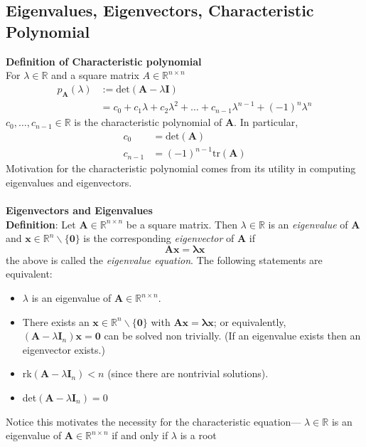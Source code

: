 \documentclass{report}
\begin{document}
\subsection{Eigenvalues, Eigenvectors, Characteristic Polynomial}%
\textbf{Definition of Characteristic polynomial}\\
For $\lambda\in\mathbb{R}$ and a square matrix $A\in\mathbb{R}^{n\times n}$
\begin{align*}
p_{\bm{A}}(\lambda)&:=\text{det}(\bm{A}-\lambda\bm{I})\\
&=c_0+c_1\lambda+c_2\lambda^2+\ldots+c_{n-1}\lambda^{n-1}
+(-1)^n\lambda^n
\end{align*}
$c_0,\ldots,c_{n-1}\in\mathbb{R}$ is the characteristic polynomial of $\bm{A}$. In particular,
\begin{align*}
c_0&=\text{det}(\bm{A})\\
c_{n-1}&=(-1)^{n-1}\text{tr}(\bm{A})
\end{align*}
Motivation for the characteristic polynomial comes from its utility in computing eigenvalues and eigenvectors.\\
\vspace{1mm}\\
\textbf{Eigenvectors and Eigenvalues}\\
\textbf{Definition}: Let $\bm{A}\in\mathbb{R}^{n\times n}$ be a square matrix. Then $\lambda\in\mathbb{R}$ is an \textit{eigenvalue} of $\bm{A}$ and $\bm{x}\in\mathbb{R}^n
\backslash\{\bm{0}\}$ is the corresponding \textit{eigenvector} of $\bm{A}$ if
\begin{equation*}
\bm{Ax}=\bm{\lambda x}
\end{equation*}
the above is called the \textit{eigenvalue equation}. The following statements are equivalent:
\begin{itemize}
\item$\lambda$ is an eigenvalue of $\bm{A}\in\mathbb{R}^{n\times n}$.
\item There exists an $\bm{x}\in\mathbb{R}^n\backslash\{\bm{0}\}$ with $\bm{Ax}=\bm{\lambda x}$; or equivalently,
$(\bm{A}-\lambda\bm{I}_n)\bm{x}=\bm{0}$ can be solved non trivially. 
(If an eigenvalue exists then an eigenvector exists.)
\item rk$(\bm{A}-\lambda\bm{I}_n)<n$ (since there are nontrivial solutions).
\item det$(\bm{A}-\lambda\bm{I}_n)=0$
\end{itemize}
Notice this motivates the necessity for the characteristic equation---
$\lambda\in\mathbb{R}$ is an eigenvalue of $\bm{A}\in\mathbb{R}^{n\times n}$ if and only if $\lambda$ is a root
\end{document}
